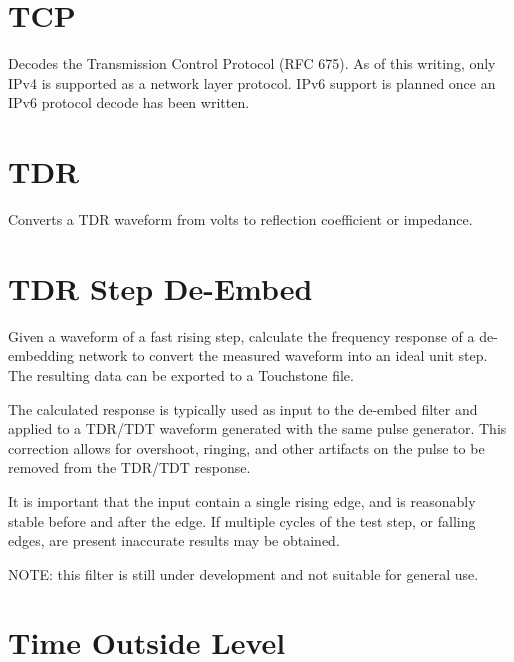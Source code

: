 \pagebreak
\section{TCP}

Decodes the Transmission Control Protocol (RFC 675). As of this writing, only IPv4 is supported as a network layer
protocol. IPv6 support is planned once an IPv6 protocol decode has been written.

\pagebreak
\section{TDR}

Converts a TDR waveform from volts to reflection coefficient or impedance.

\pagebreak
\section{TDR Step De-Embed}

Given a waveform of a fast rising step, calculate the frequency response of a de-embedding network to convert the
measured waveform into an ideal unit step. The resulting data can be exported to a Touchstone file.

The calculated response is typically used as input to the de-embed filter and applied to a TDR/TDT waveform generated
with the same pulse generator. This correction allows for overshoot, ringing, and other artifacts on the pulse to be
removed from the TDR/TDT response.

It is important that the input contain a single rising edge, and is reasonably stable before and after the edge.
If multiple cycles of the test step, or falling edges, are present inaccurate results may be obtained.

NOTE: this filter is still under development and not suitable for general use.

\pagebreak
\section{Time Outside Level}

